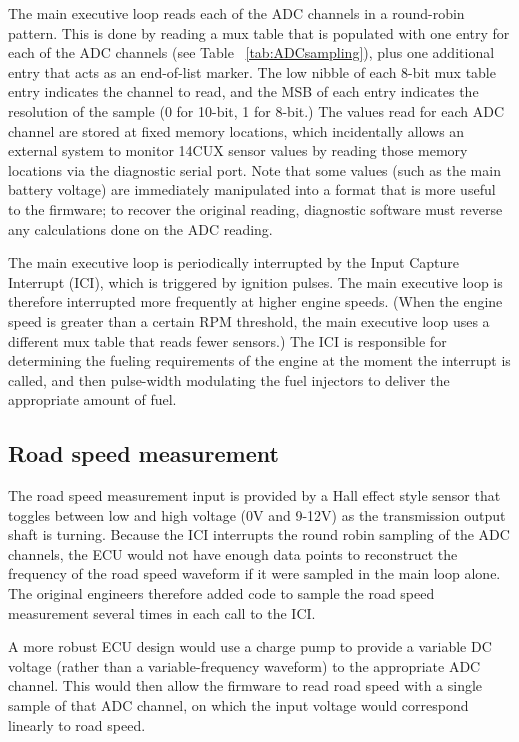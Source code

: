\documentclass[11pt,twocolumn]{scrartcl}
\begin{document}
The main executive loop reads each of the ADC channels in a round-robin pattern. This is done by reading a mux table that is populated with one entry for each of the ADC channels (see Table ~\ref{tab:ADCsampling}), plus one additional entry that acts as an end-of-list marker. The low nibble of each 8-bit mux table entry indicates the channel to read, and the MSB of each entry indicates the resolution of the sample (0 for 10-bit, 1 for 8-bit.) The values read for each ADC channel are stored at fixed memory locations, which incidentally allows an external system to monitor 14CUX sensor values by reading those memory locations via the diagnostic serial port. Note that some values (such as the main battery voltage) are immediately manipulated into a format that is more useful to the firmware; to recover the original reading, diagnostic software must reverse any calculations done on the ADC reading.

The main executive loop is periodically interrupted by the Input Capture Interrupt (ICI), which is triggered by ignition pulses. The main executive loop is therefore interrupted more frequently at higher engine speeds. (When the engine speed is greater than a certain RPM threshold, the main executive loop uses a different mux table that reads fewer sensors.) The ICI is responsible for determining the fueling requirements of the engine at the moment the interrupt is called, and then pulse-width modulating the fuel injectors to deliver the appropriate amount of fuel.

\subsection{Road speed measurement}
The road speed measurement input is provided by a Hall effect style sensor that toggles between low and high voltage (0V and 9-12V) as the transmission output shaft is turning. Because the ICI interrupts the round robin sampling of the ADC channels, the ECU would not have enough data points to reconstruct the frequency of the road speed waveform if it were sampled in the main loop alone. The original engineers therefore added code to sample the road speed measurement several times in each call to the ICI.

A more robust ECU design would use a charge pump to provide a variable DC voltage (rather than a variable-frequency waveform) to the appropriate ADC channel. This would then allow the firmware to read road speed with a single sample of that ADC channel, on which the input voltage would correspond linearly to road speed.
\end{document}
